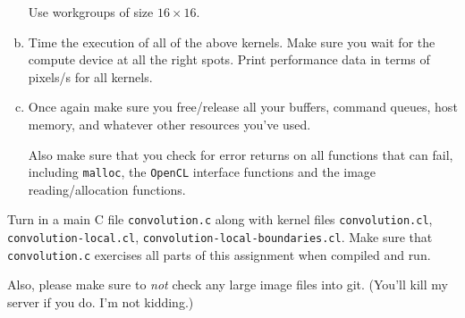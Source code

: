 \documentclass[11pt]{article}
\begin{document}
\begin{enumerate}[a)]
    Use workgroups of size $16\times 16$.

  \item Time the execution of all of the above kernels. Make sure you
    wait for the compute device at all the right spots. Print
    performance data in terms of pixels/s for all kernels.

  \item Once again make sure you free/release all your buffers,
    command queues, host memory, and whatever other resources you've
    used.

    Also make sure that you check for error returns on all functions
    that can fail, including \texttt{malloc}, the \texttt{OpenCL}
    interface functions and the image reading/allocation functions.
\end{enumerate}

Turn in a main C file \texttt{convolution.c} along with
kernel files \texttt{convolution.cl},
\texttt{convolution-local.cl},
\texttt{convolution-local-boundaries.cl}. Make sure that
\texttt{convolution.c} exercises all parts of this assignment when
compiled and run.

Also, please make sure to \emph{not} check any large image files
into git. (You'll kill my server if you do. I'm not kidding.)
\end{document}

